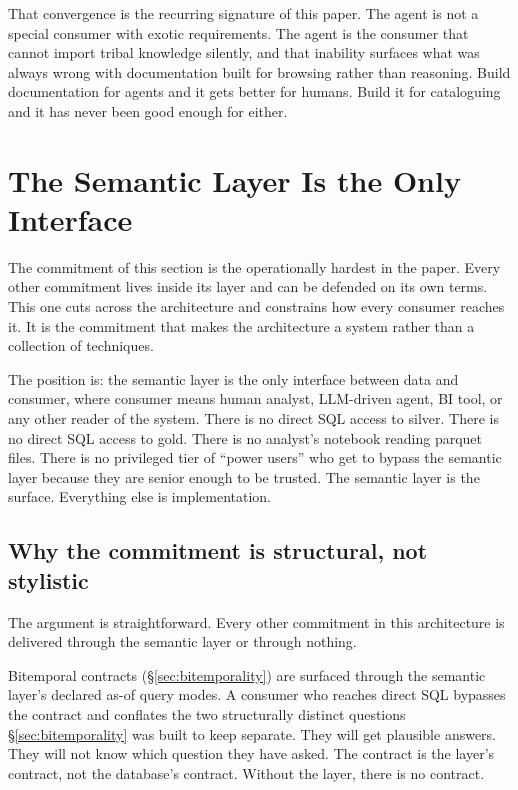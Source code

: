 \documentclass[11pt,a4paper]{article}
\begin{document}
That convergence is the recurring signature of this paper. The agent is not a special consumer with exotic requirements. The agent is the consumer that cannot import tribal knowledge silently, and that inability surfaces what was always wrong with documentation built for browsing rather than reasoning. Build documentation for agents and it gets better for humans. Build it for cataloguing and it has never been good enough for either.

\section{The Semantic Layer Is the Only Interface}
\label{sec:interface}

The commitment of this section is the operationally hardest in the paper. Every other commitment lives inside its layer and can be defended on its own terms. This one cuts across the architecture and constrains how every consumer reaches it. It is the commitment that makes the architecture a system rather than a collection of techniques.

The position is: the semantic layer is the only interface between data and consumer, where consumer means human analyst, LLM-driven agent, BI tool, or any other reader of the system. There is no direct SQL access to silver. There is no direct SQL access to gold. There is no analyst's notebook reading parquet files. There is no privileged tier of ``power users'' who get to bypass the semantic layer because they are senior enough to be trusted. The semantic layer is the surface. Everything else is implementation.

\subsection{Why the commitment is structural, not stylistic}

The argument is straightforward. Every other commitment in this architecture is delivered through the semantic layer or through nothing.

Bitemporal contracts (\S\ref{sec:bitemporality}) are surfaced through the semantic layer's declared as-of query modes. A consumer who reaches direct SQL bypasses the contract and conflates the two structurally distinct questions \S\ref{sec:bitemporality} was built to keep separate. They will get plausible answers. They will not know which question they have asked. The contract is the layer's contract, not the database's contract. Without the layer, there is no contract.
\end{document}
